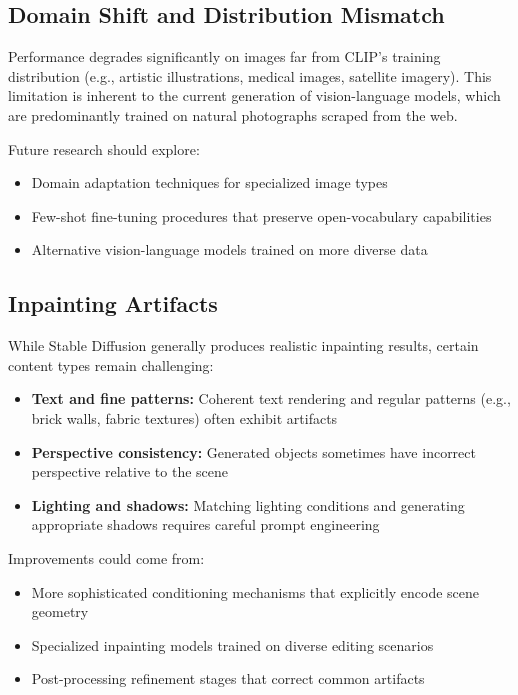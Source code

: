 \subsection{Domain Shift and Distribution Mismatch}

Performance degrades significantly on images far from CLIP's training distribution (e.g., artistic illustrations, medical images, satellite imagery). This limitation is inherent to the current generation of vision-language models, which are predominantly trained on natural photographs scraped from the web.

Future research should explore:
\begin{itemize}
    \item Domain adaptation techniques for specialized image types
    \item Few-shot fine-tuning procedures that preserve open-vocabulary capabilities
    \item Alternative vision-language models trained on more diverse data
\end{itemize}

\subsection{Inpainting Artifacts}

While Stable Diffusion generally produces realistic inpainting results, certain content types remain challenging:
\begin{itemize}
    \item \textbf{Text and fine patterns:} Coherent text rendering and regular patterns (e.g., brick walls, fabric textures) often exhibit artifacts
    \item \textbf{Perspective consistency:} Generated objects sometimes have incorrect perspective relative to the scene
    \item \textbf{Lighting and shadows:} Matching lighting conditions and generating appropriate shadows requires careful prompt engineering
\end{itemize}

Improvements could come from:
\begin{itemize}
    \item More sophisticated conditioning mechanisms that explicitly encode scene geometry
    \item Specialized inpainting models trained on diverse editing scenarios
    \item Post-processing refinement stages that correct common artifacts
\end{itemize}

